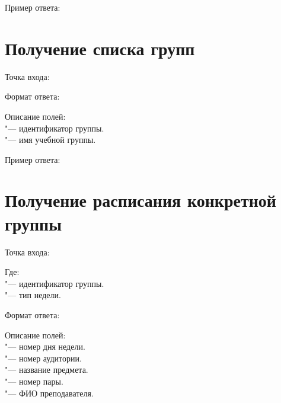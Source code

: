 Пример ответа:
\begin{listing}[H]
\end{listing}
\vspace{-0.75cm}

\section{Получение списка групп}
\label{sec:groups}

Точка входа: 

Формат ответа:
\begin{listing}[H]
\end{listing}
\vspace{-0.75cm}

Описание полей:\\
 "--- идентификатор группы.\\
 "--- имя учебной группы.

Пример ответа:
\begin{listing}[H]
\end{listing}
\vspace{-0.75cm}

\section{Получение расписания конкретной группы}
\label{sec:group}

Точка входа: 

Где:\\
 "--- идентификатор группы.\\
 "--- тип недели.

Формат ответа:
\begin{listing}[H]
\end{listing}
\vspace{-0.75cm}

Описание полей:\\
 "--- номер дня недели.\\
 "--- номер аудитории.\\
 "--- название предмета.\\
 "--- номер пары.\\
 "--- ФИО преподавателя.

